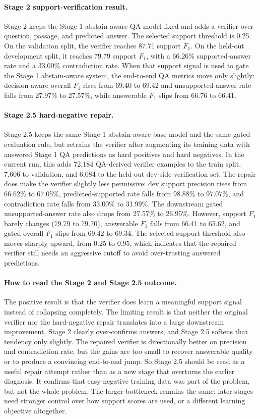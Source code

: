 \paragraph{Stage 2 support-verification result.}
Stage 2 keeps the Stage 1 abstain-aware QA model fixed and adds a verifier over
question, passage, and predicted answer.
The selected support threshold is 0.25.
On the validation split, the verifier reaches 87.71 support $F_1$.
On the held-out development split, it reaches 79.79 support $F_1$, with a
66.26\% supported-answer rate and a 33.00\% contradiction rate.
When that support signal is used to gate the Stage 1 abstain-aware system, the
end-to-end QA metrics move only slightly: decision-aware overall $F_1$ rises
from 69.40 to 69.42 and unsupported-answer rate falls from 27.97\% to 27.57\%,
while answerable $F_1$ slips from 66.76 to 66.41.

\paragraph{Stage 2.5 hard-negative repair.}
Stage 2.5 keeps the same Stage 1 abstain-aware base model and the same gated
evaluation rule, but retrains the verifier after augmenting its training data
with answered Stage 1 QA predictions as hard positives and hard negatives.
In the current run, this adds 72{,}184 QA-derived verifier examples to the
train split, 7{,}606 to validation, and 6{,}084 to the held-out dev-side
verification set.
The repair does make the verifier slightly less permissive:
dev support precision rises from 66.62\% to 67.05\%, predicted-supported rate
falls from 98.88\% to 97.07\%, and contradiction rate falls from 33.00\% to
31.99\%.
The downstream gated unsupported-answer rate also drops from 27.57\% to
26.95\%.
However, support $F_1$ barely changes (79.79 to 79.70), answerable $F_1$
falls from 66.41 to 65.62, and gated overall $F_1$ slips from 69.42 to 69.34.
The selected support threshold also moves sharply upward, from 0.25 to 0.95,
which indicates that the repaired verifier still needs an aggressive cutoff to
avoid over-trusting answered predictions.

\paragraph{How to read the Stage 2 and Stage 2.5 outcome.}
The positive result is that the verifier does learn a meaningful support signal
instead of collapsing completely.
The limiting result is that neither the original verifier nor the hard-negative
repair translates into a large downstream improvement.
Stage 2 clearly over-confirms answers, and Stage 2.5 softens that tendency only
slightly.
The repaired verifier is directionally better on precision and contradiction
rate, but the gains are too small to recover answerable quality or to produce
a convincing end-to-end jump.
So Stage 2.5 should be read as a useful repair attempt rather than as a new
stage that overturns the earlier diagnosis.
It confirms that easy-negative training data was part of the problem, but not
the whole problem.
The larger bottleneck remains the same:
later stages need stronger control over how support scores are used, or a
different learning objective altogether.

